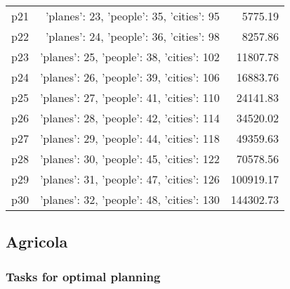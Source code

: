 \documentclass{article}
\begin{document}
\begin{center}
\begin{tabular}{@{}l|r|r@{}}
  p21&{'planes': 23, 'people': 35, 'cities': 95}&5775.19\\
  p22&{'planes': 24, 'people': 36, 'cities': 98}&8257.86\\
  p23&{'planes': 25, 'people': 38, 'cities': 102}&11807.78\\
  p24&{'planes': 26, 'people': 39, 'cities': 106}&16883.76\\
  p25&{'planes': 27, 'people': 41, 'cities': 110}&24141.83\\
  p26&{'planes': 28, 'people': 42, 'cities': 114}&34520.02\\
  p27&{'planes': 29, 'people': 44, 'cities': 118}&49359.63\\
  p28&{'planes': 30, 'people': 45, 'cities': 122}&70578.56\\
  p29&{'planes': 31, 'people': 47, 'cities': 126}&100919.17\\
  p30&{'planes': 32, 'people': 48, 'cities': 130}&144302.73
                            \end{tabular}
                            \end{center}
                    
                            \newpage \subsection{Agricola}
                    \subsubsection*{Tasks for optimal planning}
                    
\end{document}
